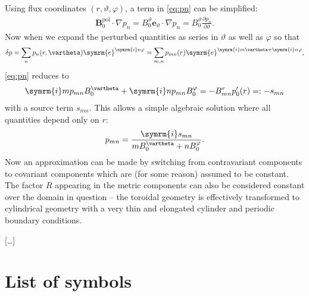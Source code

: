 \documentclass[a4paper, twoside, 10pt, english]{article}
\numberwithin{equation}{section}
\let\temp\varrho
\let\varrho\rho
\let\rho\temp
\let\temp\vartheta
\let\vartheta\theta
\let\theta\temp
\let\temp\varphi
\let\varphi\phi
\let\phi\temp
\let\vec\symbf
\newcommand*\grad{\ensuremath{\nabla}}
\newcommand*\e{\ensuremath{\symrm{e}}}  %
\newcommand*\im{\ensuremath{\symrm{i}}}  %
\newcommand*\pd[2][]{\ensuremath{\frac{\partial #1}{\partial #2}}}  %
\newcommand*\pol{\ensuremath{\textrm{pol}}}  %
\begin{document}
Using flux coordinates $(r, \theta, \phi)$, a term in \cref{eq:pn} can be simplified:
\begin{gather}
  \vec{B}_{0}^{\pol} \cdot \grad p_{n} = B_{0}^{\theta} \vec{e}_{\theta} \cdot \grad p_{n} = B_{0}^{\theta} \pd[p_{n}]{\theta}.
\end{gather}
Now when we expand the perturbed quantities as series in $\theta$ as well as $\phi$ so that
\begin{gather}
  \delta p = \sum_{n} p_n(r, \theta) \e^{\im n \phi} = \sum_{m, n} p_{mn}(r) \e^{\im m \theta + \im n \phi},
\end{gather}
\cref{eq:pn} reduces to
\begin{gather}
  \im m p_{mn} B_{0}^{\theta} + \im n p_{mn} B_{0}^{\phi} = -B_{mn}^{r} p_{0}'(r) =: -s_{mn}
\end{gather}
with a source term $s_{mn}$. This allows a simple algebraic solution where all quantities depend only on $r$:
\begin{gather}
  p_{mn} =  \frac{\im s_{mn}}{m B_{0}^{\theta} + n B_{0}^{\phi}}.
\end{gather}
Now an approximation can be made by switching from contravariant components to covariant components which are (for some reason) assumed to be constant. The factor $R$ appearing in the metric components can also be considered constant over the domain in question -- the toroidal geometry is effectively transformed to cylindrical geometry with a very thin and elongated cylinder and periodic boundary conditions.

[\ldots]

\clearpage
\appendix
\section{List of symbols}
\end{document}
